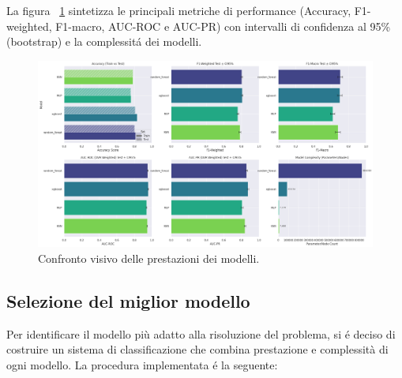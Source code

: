 \documentclass[a4paper,12pt]{report}
\begin{document}
	La figura ~\ref{fig:comparison_pm} sintetizza le principali metriche di performance (Accuracy, F1-weighted, F1-macro, AUC-ROC e AUC-PR) con intervalli di confidenza al 95\% (bootstrap) e la complessitá dei modelli.
	
	\begin{figure}[H]
		\centering
		\includegraphics[width=1.0\textwidth]{img/comparison_pm.png}
		\caption{Confronto visivo delle prestazioni dei modelli.}
		\label{fig:comparison_pm}
	\end{figure}
	
	\subsection{Selezione del miglior modello}
	Per identificare il modello più adatto alla risoluzione del problema, si é deciso di costruire un sistema di classificazione che combina prestazione e complessità di ogni modello. La procedura implementata é la seguente:
	
\end{document}
